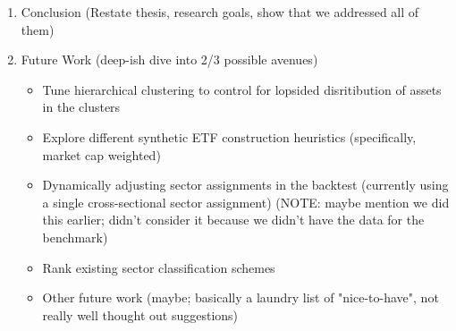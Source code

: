\documentclass[../main.tex]{subfiles}
\begin{document}
\begin{enumerate}
    
    \item Conclusion (Restate thesis, research goals, show that we addressed all of them)

    \item Future Work (deep-ish dive into 2/3 possible avenues)
    \begin{itemize}
        \item Tune hierarchical clustering to control for lopsided disritibution of assets in the clusters
        \item Explore different synthetic ETF construction heuristics (specifically, market cap weighted)
        \item Dynamically adjusting sector assignments in the backtest (currently using a single cross-sectional sector assignment) (NOTE: maybe mention we did this earlier; didn't consider it because we didn't have the data for the benchmark)
        \item Rank existing sector classification schemes
        \item Other future work (maybe; basically a laundry list of "nice-to-have", not really well thought out suggestions)
    \end{itemize}
    
\end{enumerate}
\end{document}
